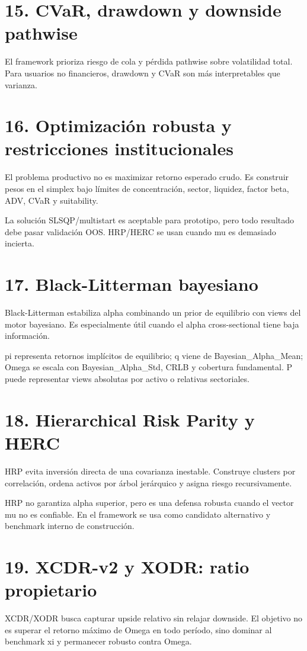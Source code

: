 \documentclass[11pt,letterpaper]{article}
\begin{document}
\section{15. CVaR, drawdown y downside pathwise}
El framework prioriza riesgo de cola y pérdida pathwise sobre volatilidad total. Para usuarios no financieros, drawdown y CVaR son más interpretables que varianza.

\section{16. Optimización robusta y restricciones institucionales}
El problema productivo no es maximizar retorno esperado crudo. Es construir pesos en el simplex bajo límites de concentración, sector, liquidez, factor beta, ADV, CVaR y suitability.

La solución SLSQP/multistart es aceptable para prototipo, pero todo resultado debe pasar validación OOS. HRP/HERC se usan cuando mu es demasiado incierta.

\section{17. Black-Litterman bayesiano}
Black-Litterman estabiliza alpha combinando un prior de equilibrio con views del motor bayesiano. Es especialmente útil cuando el alpha cross-sectional tiene baja información.

pi representa retornos implícitos de equilibrio; q viene de Bayesian\_Alpha\_Mean; Omega se escala con Bayesian\_Alpha\_Std, CRLB y cobertura fundamental. P puede representar views absolutas por activo o relativas sectoriales.

\section{18. Hierarchical Risk Parity y HERC}
HRP evita inversión directa de una covarianza inestable. Construye clusters por correlación, ordena activos por árbol jerárquico y asigna riesgo recursivamente.

HRP no garantiza alpha superior, pero es una defensa robusta cuando el vector mu no es confiable. En el framework se usa como candidato alternativo y benchmark interno de construcción.

\section{19. XCDR-v2 y XODR: ratio propietario}
XCDR/XODR busca capturar upside relativo sin relajar downside. El objetivo no es superar el retorno máximo de Omega en todo período, sino dominar al benchmark xi y permanecer robusto contra Omega.
\end{document}
